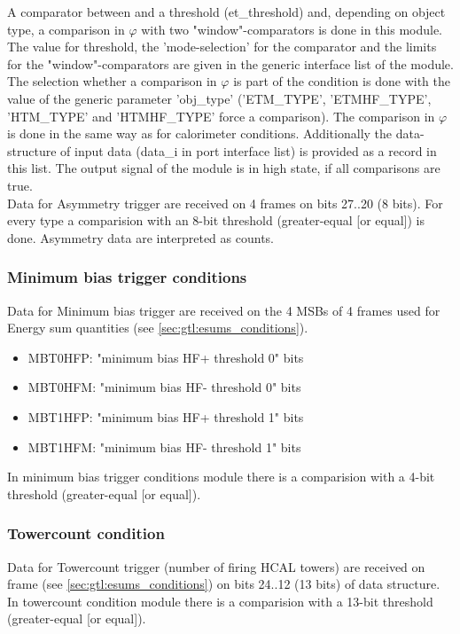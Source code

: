 A comparator between \et and a threshold (et\_threshold) and, depending on object type, a comparison in $\varphi$ with
two "window"-comparators is done in this module.
The value for \et threshold, the 'mode-selection' for the \et comparator and the limits for the "window"-comparators are given in the generic interface list of the module.
The selection whether a comparison in $\varphi$ is part of the condition is done with the value of the generic parameter 'obj\_type'
('ETM\_TYPE', 'ETMHF\_TYPE', 'HTM\_TYPE' and 'HTMHF\_TYPE' force a comparison).
The comparison in $\varphi$ is done in the same way as for calorimeter conditions.
Additionally the data-structure of input data (data\_i in port interface list) is provided
as a record in this list. The output signal of the module is in high state, if all comparisons are true.\\
Data for Asymmetry trigger are received on 4 frames on bits 27..20 (8 bits). For every type a comparision with an 8-bit threshold (greater-equal [or equal]) is done.
Asymmetry data are interpreted as counts.

\subsubsection{Minimum bias trigger conditions}
\label{sec:gtl:min_bias_conditions}

Data for Minimum bias trigger are received on the 4 MSBs of 4 frames used for Energy sum quantities (see \ref{sec:gtl:esums_conditions}).

\begin{itemize}
\item MBT0HFP: "minimum bias HF+ threshold 0" bits
\item MBT0HFM: "minimum bias HF- threshold 0" bits
\item MBT1HFP: "minimum bias HF+ threshold 1" bits
\item MBT1HFM: "minimum bias HF- threshold 1" bits
\end{itemize}

In minimum bias trigger conditions module there is a comparision with a 4-bit threshold (greater-equal [or equal]).

\subsubsection{Towercount condition}
\label{sec:gtl:towercount_cond}

Data for Towercount trigger (number of firing HCAL towers) are received on frame \htt (see \ref{sec:gtl:esums_conditions}) on bits 24..12 (13 bits) of \htt data structure.\\
In towercount condition module there is a comparision with a 13-bit threshold (greater-equal [or equal]).

